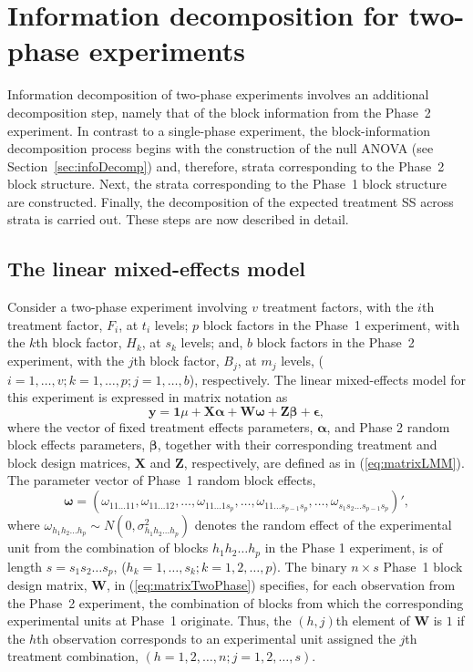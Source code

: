 \documentclass[article]{jss}
\newcommand{\Z}{\mathbf{Z}}
\newcommand{\X}{\mathbf{X}}
\newcommand{\W}{\mathbf{W}}
\begin{document}
\section{Information decomposition for two-phase experiments} 
\label{sec:infoiDecompTwoPase}
Information decomposition of two-phase experiments involves an additional decomposition step, namely that of the block information from the Phase~2 experiment. In contrast to a single-phase experiment, the block-information decomposition process begins with the construction of the null ANOVA (see Section~\ref{sec:infoDecomp}) and, therefore, strata corresponding to the Phase~2 block structure.  Next, the strata corresponding to the Phase~1 block structure are constructed. Finally, the decomposition of the expected treatment SS across strata is carried out. These steps are now described in detail.

\subsection{The linear mixed-effects model}
\label{subsec:phase2Model}
Consider a two-phase experiment involving $v$ treatment factors, with the $i$th treatment factor, $F_i$, at $t_i$ levels; $p$ block factors in the Phase~1 experiment, with the $k$th block factor, $H_k$, at $s_k$ levels; and, $b$ block factors in the Phase~2 experiment, with the $j$th block factor, $B_j$, at $m_j$ levels, ($i = 1,\dots,v; k = 1,\dots,p; j = 1,\dots,b$), respectively. The linear mixed-effects model for this experiment is expressed in matrix notation as 
\begin{equation}
\label{eq:matrixTwoPhase}
\bm{y} = \bm{1}\mu + \X\bm{\alpha} + \W\bm{\omega} + \Z\bm{\beta} + \bm{\epsilon},
\end{equation}
where the vector of fixed treatment effects parameters, $\bm{\alpha}$, and Phase 2 random block effects parameters, $\bm{\beta}$, together with their corresponding treatment and block design matrices, $\X$ and $\Z$, respectively, are defined as in (\ref{eq:matrixLMM}). The parameter vector of Phase~1 random block effects,  
\begin{equation}
\label{eq:phase1BlockPar}
\bm{\omega} = (\omega_{11 \dots 11}, \omega_{11 \dots 12}, \dots,  \omega_{1 1 \dots 1s_p},\dots,\omega_{1 1 \dots s_{p-1}s_p},\dots,\omega_{s_1 s_2 \dots s_{p-1}s_p})',
\end{equation}
where $\omega_{h_1 h_2 \dots h_p}\sim N(0,\sigma^2_{h_1 h_2 \dots h_p})$ denotes the random effect of the experimental unit from the combination of blocks $h_1h_2\ldots h_p$ in the Phase 1 experiment, is of length $s = s_1 s_2 \dots s_p$, ($h_k = 1, \dots, s_k; k = 1,2, \dots, p$). The binary $n \times s$ Phase~1 block design matrix, $\W$, in (\ref{eq:matrixTwoPhase}) specifies, for each observation from the Phase~2 experiment, the combination of blocks from which the corresponding experimental units at Phase~1 originate. Thus, the $(h,j)$th element of $\W$ is $1$ if the $h$th observation corresponds to an experimental unit assigned the $j$th treatment combination, $(h=1,2,\dots,n; j=1,2,\dots, s)$. 
\end{document}
